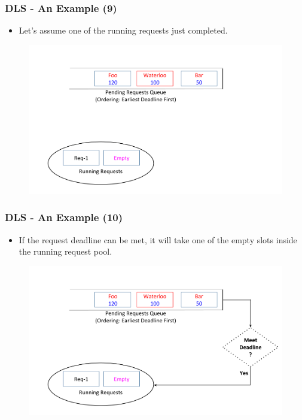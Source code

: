 \documentclass{beamer}
\begin{document}
\begin{frame}
  \frametitle{DLS - An Example (9)}
  \begin{itemize}
  \item Let's assume one of the running requests just completed.
    \newline
    \newline
  \end{itemize}
  \vspace{-5 mm}
  \begin{figure}
    \begin{center}
      \centerline{\includegraphics[scale=0.33]{img/DLS_Example_ZOOM_3.png}}
    \end{center}
  \end{figure}
\end{frame}


\begin{frame}
  \frametitle{DLS - An Example (10)}
  \begin{itemize}
  \item If the request deadline can be met, it will take one of the empty slots
    inside the running request pool.
    \newline
  \end{itemize}
  \vspace{-5 mm}
  \begin{figure}
    \begin{center}
      \centerline{\includegraphics[scale=0.33]{img/DLS_Example_ZOOM_4.png}}
    \end{center}
  \end{figure}
\end{frame}
\end{document}
